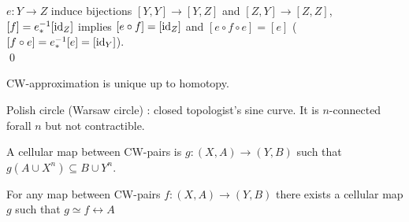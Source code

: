     \begin{prf}
        $e : Y \to Z$ induce bijections $ [Y,Y] \to [Y,Z]$ and $[Z,Y] \to [Z,Z]$,
        $[f] = e_{\ast}^{-1} [\mathrm{id}_Z]$ implies $[e \circ f] = [\mathrm{id}_Z]$ and $[e \circ f \circ e] = [e]$ ($[f \circ e] = e_{\ast}^{-1}[e] = [\mathrm{id}_Y]$).\\
        \qed
    \end{prf}

    \begin{cor}
        CW-approximation is unique up to homotopy.
    \end{cor}

    \begin{exmp}
        Polish circle (Warsaw circle) : closed topologist's sine curve.
        It is $n$-connected forall $n$ but not contractible.
    \end{exmp}

    \begin{defn}
        A cellular map between CW-pairs is $g:(X,A) \to (Y,B)$ such that
        $g(A\cup X^n) \subseteq B \cup Y^n$.
    \end{defn}

    \begin{thm}
        For any map between CW-pairs $f : (X,A) \to (Y,B)$ there exists
        a cellular map $g$ such that $g \simeq f \rel A$
    \end{thm}

